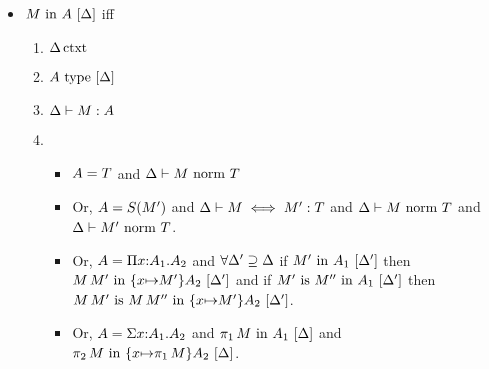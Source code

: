 \documentclass{article}
\theoremstyle{break}
\begin{document}
\begin{itemize}
\item $\semanticvalidterm{\world}{\constructor}{\kind}$ iff
\begin{enumerate}
\item $\semanticcontext{\world}$
\item $\semanticvalidtype{\world}{\kind}$
\item $\validconstructor{\world}{\constructor}{\kind}$
\item 
\begin{itemize}{}
\item $\kind = \ktype$ and $\normterm{\world}{\constructor}{\ktype}$
\item Or, $\kind = \ksingleton{\constructor'}$ and 
$\aconequiv{\world}{\constructor}{\constructor'}{\ktype}$ and
$\normterm{\world}{\constructor}{\ktype}$ and $\normterm{\world}{\constructor'}{\ktype}$.
\item Or, $\kind = \kpi{\cvar}{\kind_1}{\kind_2}$ and
$\forall \world'\supseteq\world$ if $\semanticvalidterm{\world'}{\constructor'}{\kind_1}$
then $\semanticvalidterm{\world'}{\capply{\constructor}{\constructor'}}{\substitute{\cvar}{\constructor'}{\kind_2}}$ and
if $\semanticequivterm{\world'}{\constructor'}{\constructor''}{\kind_1}$ then
$\semanticequivterm{\world'}{\capply{\constructor}{\constructor'}}{\capply{\constructor}{\constructor''}}{\substitute{\cvar}{\constructor'}{\kind_2}}$.
\item Or, $\kind = \ksigma{\cvar}{\kind_1}{\kind_2}$ and
$\semanticvalidterm{\world}{\cpi{1}{\constructor}}{\kind_1}$ and
$\semanticvalidterm{\world}{\cpi{2}{\constructor}}{\substitute{\cvar}{\cpi{1}{\constructor}}{\kind_2}}$.
\end{itemize}
\end{enumerate}


\end{itemize}
\end{document}
